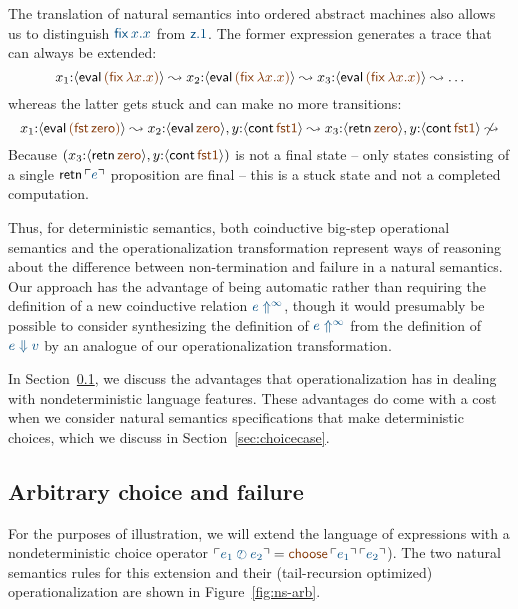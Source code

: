 The translation of natural semantics into ordered abstract machines
also allows us to distinguish $\obj{{\sf fix}\,x.x}$ from $\obj{{\sf z}.1}$.
The former expression generates a trace that can always be extended:
\[ x_1{:}\susp{{\sf eval}\,\lf{({\sf fix}\,\lambda x.x)}} \leadsto
   x_2{:}\susp{{\sf eval}\,\lf{({\sf fix}\,\lambda x.x)}} \leadsto
   x_3{:}\susp{{\sf eval}\,\lf{({\sf fix}\,\lambda x.x)}} \leadsto \ldots 
\]whereas the latter gets stuck and can make no more transitions:\[ 
  x_1{:}\susp{{\sf eval}\,\lf{({\sf fst}\,{\sf zero})}} \leadsto
  x_2{:}\susp{{\sf eval}\,\lf{\sf zero}}, y{:}\susp{{\sf cont}\,\lf{\sf fst1}} \leadsto
  x_3{:}\susp{{\sf retn}\,\lf{\sf zero}}, y{:}\susp{{\sf cont}\,\lf{\sf fst1}} 
  \not\leadsto
\]
Because $( x_3{:}\susp{{\sf retn}\,\lf{\sf zero}}, y{:}\susp{{\sf
    cont}\,\lf{\sf fst1}} )$ is not a final state -- only states
consisting of a single ${\sf retn}\,\interp{e}$ proposition are final
-- this is a stuck state and not a completed computation.

Thus, for deterministic semantics, both coinductive big-step
operational semantics and the operationalization transformation
represent ways of reasoning about the difference between
non-termination and failure in a natural semantics. Our approach has
the advantage of being automatic rather than requiring the definition
of a new coinductive relation $\obj{e \Uparrow^\infty}$, though it would
presumably be possible to consider synthesizing the definition of $\obj{e
\Uparrow^\infty}$ from the definition of $\obj{e \Downarrow v}$ by an
analogue of our operationalization transformation.

In Section~\ref{sec:choicefail}, we discuss the advantages that
operationalization has in dealing with nondeterministic
language features. These advantages do come with a cost when 
we consider natural semantics specifications that make deterministic
choices, which we discuss in Section~\ref{sec:choicecase}.

\subsection{Arbitrary choice and failure}
\label{sec:choicefail}

For the purposes of illustration, we will extend the language of
expressions with a nondeterministic choice operator $\interp{e_1 \arb
  e_2} = \lf{{\sf choose}\,\interp{e_1}\,\interp{e_2}}$).  The two
natural semantics rules for this extension and their
(tail-recursion optimized) operationalization are shown in
Figure~\ref{fig:ns-arb}.

